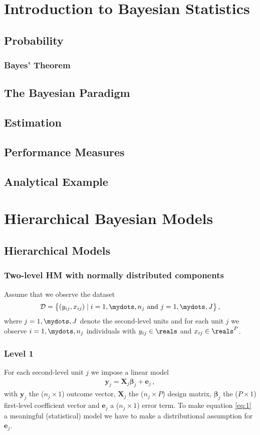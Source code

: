 \section{Introduction to Bayesian Statistics}
\subsection{Probability}
\subsubsection{Bayes' Theorem}
\subsection{The Bayesian Paradigm}
\subsection{Estimation}
\subsection{Performance Measures}
\subsection{Analytical Example}

\newpage
\section{Hierarchical Bayesian Models}

\newpage
\subsection{Hierarchical Models}
\subsubsection{Two-level HM with normally distributed components}
Assume that we observe the dataset
\begin{align*}
  \mathcal{D} = \big \{ (y_{ij}, x_{ij}) \mid i = 1,\mydots,n_j \,\, \text{and} \,\, j = 1,\mydots,J \big \} \,,
\end{align*}
where $j=1,\mydots,J$ denote the second-level units and for each unit $j$ we observe $i=1, \mydots, n_j$ individuals with $y_{ij} \in \reals$ and $x_{ij} \in \reals^P$.

\subsubsection*{Level 1}
For each second-level unit $j$ we impose a linear model
\begin{align} \label{eq:1}
  \bm{y}_j = \bm{X}_j \bm{\beta}_j + \bm{e}_j \,,
\end{align}
with $\bm{y}_j$ the ($n_j \times 1$) outcome vector, $\bm{X}_j$ the ($n_j \times P$) design matrix, $\bm{\beta}_j$ the ($P \times 1$) first-level coefficient vector and $\bm{e}_j$ a ($n_j \times 1$) error term.
To make equation \ref{eq:1} a meaningful (statistical) model we have to make a distributional assumption for $\bm{e}_j$. 

